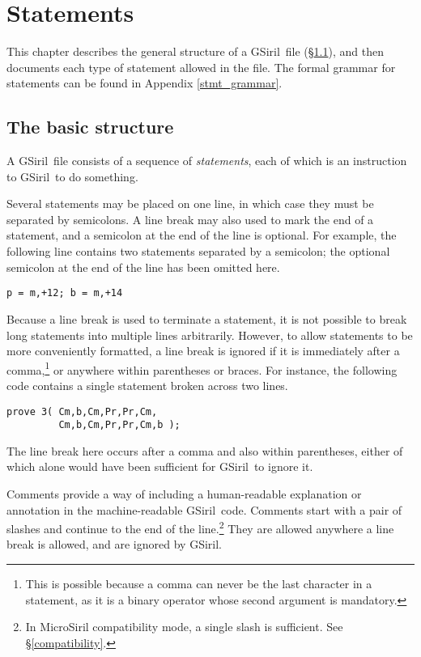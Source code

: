 \documentclass[a4paper,11pt,oneside]{book}
\def\textitidx#1{\textit{#1}\index{#1}}
\def\gsiril{GSiril}
\newcommand{\sref}[1]{\hyperref[#1]{\S\ref{#1}}}
\begin{document}
\chapter{Statements}

This chapter describes the general structure of a \gsiril\ file 
(\sref{stmt_struct}), and then documents each type of statement allowed
in the file.  
The formal grammar for statements can be found in Appendix
\ref{stmt_grammar}.

\section{The basic structure}
\label{stmt_struct}

A \gsiril\ file consists of a sequence of \textitidx{statements}, each
of which is an instruction to \gsiril\ to do something.

Several statements may be placed on one line, in which case they must be
separated by semicolons.  A line break may also used to mark the end of
a statement, and a semicolon at the end of the line is optional.  For
example, the following line contains two statements separated by a
semicolon; the optional semicolon at the end of the line has been
omitted here.

\begin{Verbatim}
p = m,+12; b = m,+14
\end{Verbatim}

Because a line break is used to terminate a statement, it is not
possible to break long statements into multiple lines arbitrarily.
However, to allow statements to be more conveniently formatted, a line
break is ignored if it is immediately after a comma,\footnote{This is
possible because a comma can never be the last character in a statement,
as it is a binary operator whose second argument is mandatory.} or
anywhere within parentheses or braces.  For instance, the
following code contains a single statement broken across two lines.

\begin{Verbatim}
prove 3( Cm,b,Cm,Pr,Pr,Cm,
         Cm,b,Cm,Pr,Pr,Cm,b );
\end{Verbatim}

The line break here occurs after a comma and also within parentheses,
either of which alone would have been sufficient for \gsiril\ to ignore
it.

Comments provide a way of including a human-readable
explanation or annotation in the machine-readable \gsiril\ code.  
Comments start with a pair of slashes and continue to the end of the
line.\footnote{In MicroSiril compatibility mode, a single slash is
sufficient.  See \sref{compatibility}.}  They are allowed anywhere a
line break is allowed, and are ignored by \gsiril.
\end{document}
